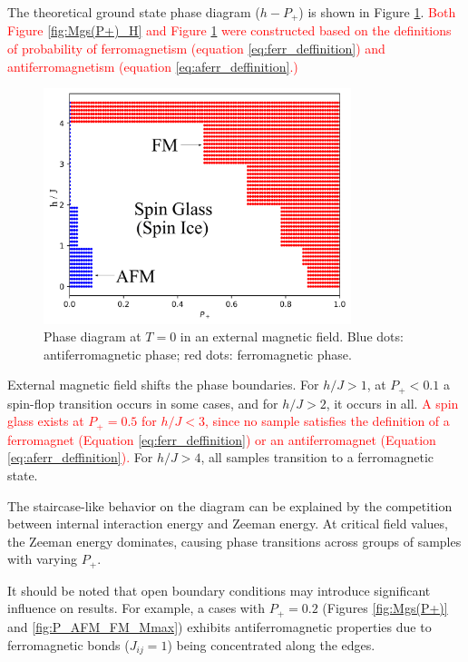 \documentclass[preprint,12pt]{elsarticle}
\begin{document}
	The theoretical ground state phase diagram ($h-P_+$) is shown in Figure \ref{fig:P+_afm_fm(H)}. \textcolor{red}{Both Figure \ref{fig:Mgs(P+)_H} and Figure \ref{fig:P+_afm_fm(H)} were constructed based on the definitions of probability of ferromagnetism (equation \eqref{eq:ferr_deffinition}) and antiferromagnetism (equation \eqref{eq:aferr_deffinition}.)}
	
	\begin{figure}[H]
		\centering
		\includegraphics[width=0.8\textwidth]{images/P+_afm_fm(H)_filled.png}
		\caption{Phase diagram at $T = 0$ in an external magnetic field. Blue dots: antiferromagnetic phase; red dots: ferromagnetic phase.}
		\label{fig:P+_afm_fm(H)}
	\end{figure}
	
	External magnetic field shifts the phase boundaries. For $h/J > 1$, at $P_+ < 0.1$ a spin-flop transition occurs in some cases, and for $h/J > 2$, it occurs in all. \textcolor{red}{A spin glass exists at $P_+ = 0.5$ for $h/J < 3$, since no sample satisfies the definition of a ferromagnet (Equation \eqref{eq:ferr_deffinition}) or an antiferromagnet (Equation \eqref{eq:aferr_deffinition}).} For $h/J > 4$, all samples transition to a ferromagnetic state. 
	
	The staircase-like behavior on the diagram can be explained by the competition between internal interaction energy and Zeeman energy. At critical field values, the Zeeman energy dominates, causing phase transitions across groups of samples with varying $P_+$.
	
	It should be noted that open boundary conditions may introduce significant influence on results. For example, a cases with $P_+ = 0.2$ (Figures \ref{fig:Mgs(P+)} and \ref{fig:P_AFM_FM_Mmax}) exhibits antiferromagnetic properties due to ferromagnetic bonds ($J_{ij} = 1$) being concentrated along the edges.
	
\end{document}
